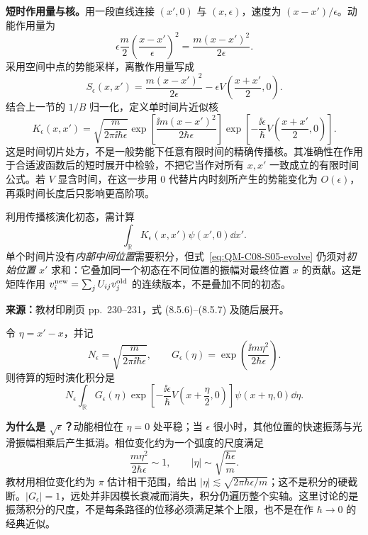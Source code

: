 \textbf{短时作用量与核。}用一段直线连接 $(x',0)$ 与 $(x,\epsilon)$，速度为 $(x-x')/\epsilon$。动能作用量为
\begin{equation}
  \epsilon\frac m2\left(\frac{x-x'}{\epsilon}\right)^2
  =\frac{m(x-x')^2}{2\epsilon}.
\end{equation}
采用空间中点的势能采样，离散作用量写成
\begin{equation}
  S_\epsilon(x,x')=
    \frac{m(x-x')^2}{2\epsilon}
    -\epsilon V\left(\frac{x+x'}2,0\right).
\end{equation}
结合上一节的 $1/B$ 归一化，定义单时间片近似核
\begin{equation}
  \boxed{K_\epsilon(x,x')=
    \sqrt{\frac{m}{2\pi\ii\hbar\epsilon}}
    \exp\!\left[\frac{\ii m(x-x')^2}{2\hbar\epsilon}\right]
    \exp\!\left[-\frac{\ii\epsilon}{\hbar}
      V\left(\frac{x+x'}2,0\right)\right]}.
  \label{eq:QM-C08-S05-short-kernel}
\end{equation}
这是时间切片处方，不是一般势能下任意有限时间的精确传播核。其准确性在作用于合适波函数后的短时展开中检验，不把它当作对所有 $x,x'$ 一致成立的有限时间公式。若 $V$ 显含时间，在这一步用 $0$ 代替片内时刻所产生的势能变化为 $O(\epsilon)$，再乘时间长度后只影响更高阶项。

利用传播核演化初态，需计算
\begin{equation}
  \int_{\mathbb R}K_\epsilon(x,x')\psi(x',0)\dd x'.
  \label{eq:QM-C08-S05-evolve}
\end{equation}
单个时间片没有\emph{内部中间位置}需要积分，但式~\eqref{eq:QM-C08-S05-evolve} 仍须对\emph{初始位置 $x'$} 求和：它叠加同一个初态在不同位置的振幅对最终位置 $x$ 的贡献。这是矩阵作用 $v_i^{\rm new}=\sum_j U_{ij}v_j^{\rm old}$ 的连续版本，不是叠加不同的初态。

\textbf{来源：}教材印刷页 pp.~230--231，式 (8.5.6)--(8.5.7) 及随后展开。

令 $\eta=x'-x$，并记
\begin{equation}
  N_\epsilon=\sqrt{\frac{m}{2\pi\ii\hbar\epsilon}},\qquad
  G_\epsilon(\eta)=\exp\!\left(\frac{\ii m\eta^2}{2\hbar\epsilon}\right).
\end{equation}
则待算的短时演化积分是
\begin{equation}
  N_\epsilon\int_{\mathbb R}G_\epsilon(\eta)
    \exp\!\left[-\frac{\ii\epsilon}{\hbar}
      V\left(x+\frac\eta2,0\right)\right]
    \psi(x+\eta,0)\dd\eta.
  \label{eq:QM-C08-S05-eta-integral}
\end{equation}

\textbf{为什么是 $\sqrt{\epsilon}$？}动能相位在 $\eta=0$ 处平稳；当 $\epsilon$ 很小时，其他位置的快速振荡与光滑振幅相乘后产生抵消。相位变化约为一个弧度的尺度满足
\begin{equation}
  \frac{m\eta^2}{2\hbar\epsilon}\sim1,
  \qquad |\eta|\sim\sqrt{\frac{\hbar\epsilon}{m}}.
  \label{eq:QM-C08-S05-scale}
\end{equation}
教材用相位变化约为 $\pi$ 估计相干范围，给出 $|\eta|\lesssim\sqrt{2\pi\hbar\epsilon/m}$；这不是积分的硬截断。$|G_\epsilon|=1$，远处并非因模长衰减而消失，积分仍遍历整个实轴。这里讨论的是振荡积分的尺度，不是每条路径的位移必须满足某个上限，也不是在作 $\hbar\to0$ 的经典近似。

